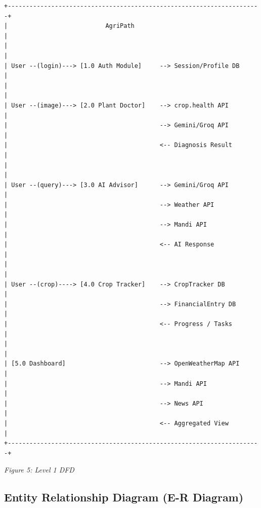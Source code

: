 \documentclass[12pt,a4paper]{article}
\begin{document}
\begin{Verbatim}[fontsize=\small, frame=single]
+----------------------------------------------------------------------+
|                           AgriPath                                   |
|                                                                      |
| User --(login)---> [1.0 Auth Module]     --> Session/Profile DB      |
|                                                                      |
| User --(image)---> [2.0 Plant Doctor]    --> crop.health API         |
|                                          --> Gemini/Groq API         |
|                                          <-- Diagnosis Result        |
|                                                                      |
| User --(query)---> [3.0 AI Advisor]      --> Gemini/Groq API         |
|                                          --> Weather API             |
|                                          --> Mandi API               |
|                                          <-- AI Response             |
|                                                                      |
| User --(crop)----> [4.0 Crop Tracker]    --> CropTracker DB          |
|                                          --> FinancialEntry DB       |
|                                          <-- Progress / Tasks        |
|                                                                      |
| [5.0 Dashboard]                          --> OpenWeatherMap API      |
|                                          --> Mandi API               |
|                                          --> News API                |
|                                          <-- Aggregated View         |
+----------------------------------------------------------------------+
\end{Verbatim}
\begin{center}
\textit{Figure 5: Level 1 DFD}
\end{center}

\subsection{Entity Relationship Diagram (E-R Diagram)}
\end{document}

